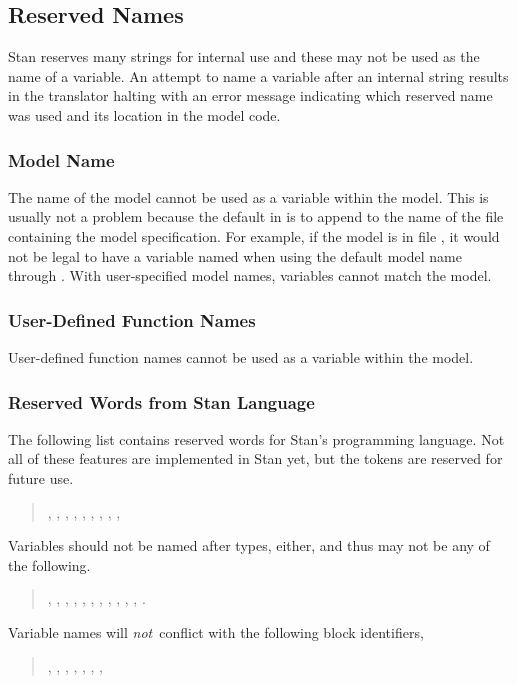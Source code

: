 \subsection{Reserved Names}

Stan reserves many strings for internal use and these may not be used
as the name of a variable.  An attempt to name a variable after an
internal string results in the  translator halting with an
error message indicating which reserved name was used and its location
in the model code.

\subsubsection{Model Name}

The name of the model cannot be used as a variable within the model.
This is usually not a problem because the default in 
is to append  to the name of the file containing the
model specification.  For example, if the model is in file
, it would not be legal to have a variable named
 when using the default model name through
.  With user-specified model names, variables cannot
match the model.

\subsubsection{User-Defined Function Names}

User-defined function names cannot be used as a variable within the
model. 

\subsubsection{Reserved Words from Stan Language}

The following list contains reserved words for Stan's programming
language.  Not all of these features are implemented in Stan yet, but
the tokens are reserved for future use.
%
\begin{quote}
,
,
,
,
,
,
,
,
, 
\end{quote}
%
Variables should not be named after types, either, and thus may not be
any of the following.
%
\begin{quote}
,
,
,
,
,
,
,
,
,
,
,
.
\end{quote}
%
Variable names will {\it not}\ conflict with the following block identifiers,
%
\begin{quote}
,
,
,
,
,
, 
,
\end{quote}
%

